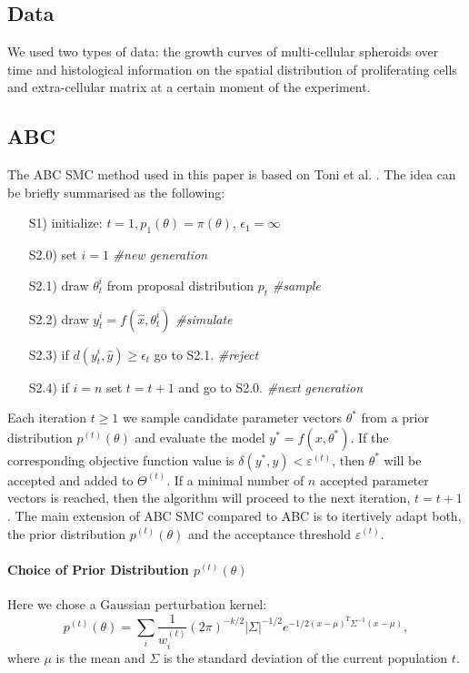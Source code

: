 \documentclass[10pt,letterpaper]{article}
\begin{document}
\subsection*{Data} 
We used two types of data: the growth curves of multi-cellular spheroids over time and histological information on the spatial distribution of proliferating cells and extra-cellular matrix at a certain moment of the experiment.

\subsection*{ABC}
The ABC SMC method used in this paper is based on Toni et al. \cite{Toni2009}. The idea can be briefly summarised as the following: 

\begin{itemize}
\item[S1)] initialize: $t=1, p_{1}(\theta) = \pi(\theta)$, $\epsilon_{1} = \infty$
\item[S2.0)] set $i = 1$ \emph{\#new generation }
\item[S2.1)] draw $\theta_{t}^{i}$ from proposal distribution $p_{t}$ \emph{\#sample}
\item[S2.2)] draw $y_{t}^{i} = f(\hat{x}, \theta_{t}^{i})$ \emph{\#simulate}
\item[S2.3)] if $d( y_{t}^{i}, \hat{y}) \ge \epsilon_t$ go to S2.1. \emph{\#reject}
\item[S2.4)] if $i = n$ set $t=t+1$ and go to S2.0.  \emph{\#next generation}
\end{itemize}

Each iteration $t \ge 1$ we sample candidate parameter vectors $\theta^*$ from a prior distribution $p^{(t)}(\theta)$ and evaluate the model $y^{*} = f(x, \theta^*)$. If the corresponding  objective function value is $\delta(y^{*}, y) < \varepsilon^{(t)}$, then $\theta^*$ will be accepted and added to $\Theta^{(t)}$. If a minimal number of $n$ accepted parameter vectors is reached, then the algorithm will proceed to the next iteration, $t = t+1$. The main extension of ABC SMC compared to ABC is to itertively adapt both, the prior distribution $p^{(t)}(\theta)$ and the acceptance threshold $\varepsilon^{(t)}$.

\paragraph{Choice of Prior Distribution $p^{(t)}(\theta)$}
Here we chose a Gaussian perturbation kernel:
\begin{equation}
	p^{(t)}(\theta) = \sum_{i}\frac{1}{w^{(t)}_{i}} (2\pi)^{-k/2} |\Sigma|^{-1/2}e^{-1/2(x-\mu)^{T}\Sigma^{-1}(x-\mu)},
\end{equation}
where $\mu$ is the mean and $\Sigma$ is the standard deviation of the current population $t$.
\end{document}
